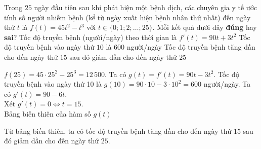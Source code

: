 \begin{ex}%
	Trong $25$ ngày đầu tiên sau khi phát hiện một bệnh dịch, các chuyên gia y tế ước tính số người nhiễm bệnh (kể từ ngày xuất hiện bệnh nhân thứ nhất) đến ngày thứ $t$ là $f(t)=45t^2-t^3$ với $t\in\{0;1;2;\ldots;25\}$.
	Mỗi kết quả dưới đây \textbf{đúng} hay \textbf{sai}?
	{Tốc độ truyền bệnh (người/ngày) theo thời gian là $f'(t)=90t+3t^2$}
	{\True Tốc độ truyền bệnh vào ngày thứ $10$ là $600$ người/ngày}
	{\True Tốc độ truyền bệnh tăng dần cho đến ngày thứ $15$ sau đó giảm dần cho đến ngày thứ $25$}
	\loigiai
	{
		\begin{itemchoice}
			\itemch $f(25)=45\cdot 25^2-25^3=12\,500$.
			\itemch Ta có $g(t)=f'(t)=90t-3t^2$. 
			\itemch Tốc độ truyền bệnh vào ngày thứ 10 là $g(10)=90\cdot 10-3\cdot 10^2=600$ người/ngày.
			\itemch Ta có $g'(t)=90-6t$. \\
			Xét $g'(t)=0 \Leftrightarrow t=15$. \\
			Bảng biến thiên của hàm số $g(t)$
			\begin{center}
			\end{center}
			Từ bảng biến thiên, ta có tốc độ truyền bệnh tăng dần cho đến ngày thứ $15$ sau đó giảm dần cho đến ngày thứ $25$.
		\end{itemchoice}
	}
\end{ex}

